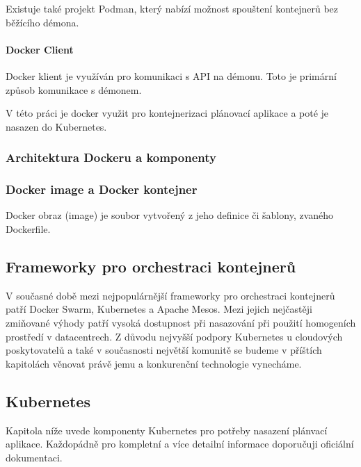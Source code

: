 \documentclass[thesis=M,czech]{FITthesis}[2019/12/23]
\theoremstyle{plain}
\theoremstyle{definition}
\begin{document}
Existuje také projekt Podman, který nabízí možnost spouštení kontejnerů bez běžícího démona. 

\paragraph{Docker Client}

Docker klient je využíván pro komunikaci s API na démonu. Toto je primární způsob komunikace s démonem.


V této práci je docker využit pro kontejnerizaci plánovací aplikace a poté je nasazen do Kubernetes.




\subsubsection{Architektura Dockeru a komponenty}


\subsubsection{Docker image a Docker kontejner}


Docker obraz (image) je soubor vytvořený z jeho definice či šablony, zvaného Dockerfile.  

\subsection{Frameworky pro orchestraci kontejnerů}


V současné době mezi nejpopulárnější frameworky pro orchestraci kontejnerů patří Docker Swarm, Kubernetes a Apache Mesos. Mezi jejich nejčastěji zmiňované výhody patří vysoká dostupnost při nasazování při použití homogeních prostředí v datacentrech. Z důvodu nejvyšší podpory Kubernetes u cloudových poskytovatelů a také v současnosti největší komunitě se budeme v příštích kapitolách věnovat právě jemu a konkurenční technologie vynecháme.

\subsection{Kubernetes}

Kapitola níže uvede komponenty Kubernetes pro potřeby nasazení plánvací aplikace. Každopádně pro kompletní a více detailní informace doporučuji oficiální dokumentaci. 
\end{document}
